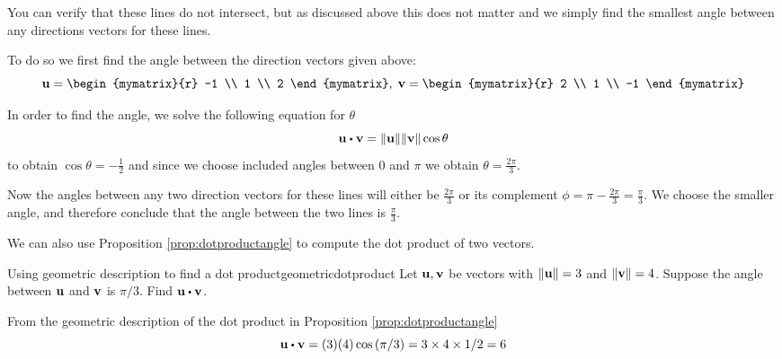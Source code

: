\begin{solution}
You can verify that these lines do not intersect, but as discussed
above this does not matter and we simply find the smallest angle
between any directions vectors for these lines.

To do so  we first find the angle
between the direction vectors given above:
\begin{equation*}
\vect{u}=\begin{mymatrix}{r}
-1 \\
1 \\
2
\end{mymatrix},\;
\vect{v}=\begin{mymatrix}{r}
2 \\
1 \\
-1
\end{mymatrix}
\end{equation*}

In order to find the angle, we solve the following equation for $\theta$
\begin{equation*}
\vect{u}\dotprod \vect{v}=\norm{\vect{u}} \norm{\vect{v}
} \cos \theta
\end{equation*}
to obtain $\cos \theta = -\frac{1}{2}$ and since we choose included
angles between $0$ and $\pi$ we obtain $\theta = \frac{2 \pi}{3}$.


Now the angles between any two direction vectors for these lines will
either be $\frac{2 \pi}{3}$ or its complement $ \phi = \pi -  \frac{2 \pi}{3}
= \frac{\pi}{3}$. We choose the smaller angle, and therefore conclude that the angle between the two lines is $\frac{\pi}{3}$.
\end{solution}

We can also use Proposition \ref{prop:dotproductangle} to compute the dot product of two vectors.

\begin{example}{Using geometric description to find a dot product}{geometricdotproduct}
Let ${\bf u},{\bf v}$ be vectors with $ \|{\bf u}\| = 3$ and $\|{\bf v}\| = 4$. 
Suppose the angle between ${\bf u}$ and ${\bf v}$ is $\pi / 3$. Find $\vect{u}\dotprod \vect{v}$.
\end{example}

\begin{solution}
From the geometric description of the dot product in Proposition \ref{prop:dotproductangle}
\begin{equation*}
\vect{u}\dotprod \vect{v}=(3)(4) \cos \tup{\pi / 3} =3\times
4\times 1/2=6
\end{equation*}
\end{solution}

